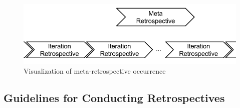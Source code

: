 \begin{figure}[!h]
	\centering
	\includegraphics[width=\textwidth, keepaspectratio]{figures/meta-retro-occurence.png}
	\caption{Visualization of meta-retrospective occurrence}
	\label{figure:retro-meta-occurence}
\end{figure}

\subsection{Guidelines for Conducting Retrospectives}

\clearpage
